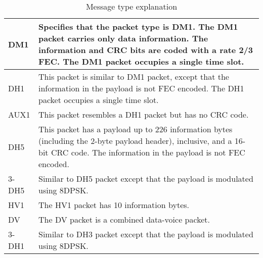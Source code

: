 
\begin{table}[h!]
\label{tab:typetable}
\begin{tabular}{|l|l|}
\hline
DM1 & Specifies that the packet type is DM1. The DM1 packet carries only data information. The information and CRC bits are coded with a rate 2/3 FEC. The DM1 packet occupies a single time slot. \\ \hline
DH1 &  This packet is similar to DM1 packet, except that the information in the payload is not FEC encoded. The DH1 packet occupies a single time slot.  \\ \hline
AUX1 & This packet resembles a DH1 packet but has no CRC code. \\ \hline
DH5 &  This packet has a payload up to 226 information bytes (including the 2-byte payload header), inclusive, and a 16-bit CRC code. The information in the payload is not FEC encoded. \\ \hline
3-DH5 & Similar to DH5 packet except that the payload is modulated using 8DPSK. \\ \hline
HV1 &  The HV1 packet has 10 information bytes. \\ \hline
DV & The DV packet is a combined data-voice packet. \\ \hline
3-DH1 & Similar to DH3 packet except that the payload is modulated using 8DPSK. \\ \hline
\end{tabular}
\caption{Message type explanation}
\end{table}